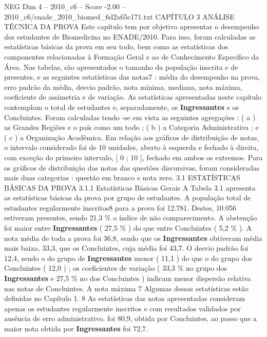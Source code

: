 \begin{textsample}{NEG Dim 4 – 2010\_c6 – Score -2.00 – 2010\_c6/enade\_2010\_biomed\_6d2a65c171.txt}  \label{ex:f4_neg_044}
CAPÍTULO 3 ANÁLISE TÉCNICA DA PROVA Este capítulo tem por objetivo apresentar o desempenho dos estudantes de Biomedicina no ENADE/2010.
Para isso, foram calculadas as estatísticas básicas da prova em seu todo, bem como as estatísticas dos componentes relacionadas à Formação Geral e ao de Conhecimento Específico da Área.
Nas tabelas, são apresentados o tamanho da população inscrita e de presentes, e as seguintes estatísticas das notas7 : média do desempenho na prova, erro padrão da média, desvio padrão, nota mínima, mediana, nota máxima, coeficiente de assimetria e de variação.
As estatísticas apresentadas neste capítulo contemplam o total de estudantes e, separadamente, os \textbf{Ingressantes} e os Concluintes.
Foram calculadas tendo -se em vista as seguintes agregações : ( a ) as Grandes Regiões e o país como um todo ; ( b ) a Categoria Administrativa ; e ( c ) a Organização Acadêmica.
Em relação aos gráficos de distribuição de notas, o intervalo considerado foi de 10 unidades, aberto à esquerda e fechado à direita, com exceção do primeiro intervalo, [ 0 ; 10 ], fechado em ambos os extremos.
Para os gráficos de distribuição das notas das questões discursivas, foram consideradas mais duas categorias : questão em branco e nota zero. 3.1 ESTATÍSTICAS BÁSICAS DA PROVA 3.1.1 Estatísticas Básicas Gerais A Tabela 3.1 apresenta as estatísticas básicas da prova por grupo de estudantes.
A população total de estudantes regularmente inscritos8 para a prova foi 12.781.
Destes, 10.056 estiveram presentes, sendo 21,3 \% o índice de não comparecimento.
A abstenção foi maior entre \textbf{Ingressantes} ( 27,5 \% ) do que entre Concluintes ( 5,2 \% ).
A nota média de toda a prova foi 36,8, sendo que os \textbf{Ingressantes} obtiveram média mais baixa, 33,3, que os Concluintes, cuja média foi 43,7.
O desvio padrão foi 12,4, sendo o do grupo de \textbf{Ingressantes} menor ( 11,1 ) do que o do grupo dos Concluintes ( 12,0 ) ; os coeficientes de variação ( 33,3 \% no grupo dos \textbf{Ingressantes} e 27,5 \% no dos Concluintes ) indicam menor dispersão relativa nas notas de Concluintes.
A nota máxima 7 Algumas dessas estatísticas estão definidas no Capítulo 1. 8 As estatísticas das notas apresentadas consideram apenas os estudantes regularmente inscritos e com resultados validados por ausência de erro administrativo. foi 80,9, obtida por Concluintes, ao passo que a maior nota obtida por \textbf{Ingressantes} foi 72,7.

\end{textsample}
